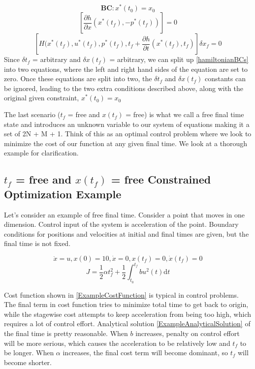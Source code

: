 ﻿\documentclass[twoside]{article}
\begin{document}
$$\textbf{BC}: x^*(t_0) = x_0$$
$$[\frac{\partial{h}}{\partial{x}}(x^*(t_f), - p^*(t_f))] = 0$$
$$[H(x^*(t_f), u^*(t_f), p^*(t_f), t_f + \frac{\partial{h}}{\partial{t}}(x^*(t_f), t_f)]\delta{x_f} = 0$$
Since $\delta{t_f}$ = arbitrary and $\delta{x(t_f)}$ = arbitrary, we can split up \ref{hamiltonianBCs} into two equations, where the left and right hand sides of the equation are set to zero. Once these equations are split into two, the $\delta{t_f}$ and $\delta{x(t_f)}$ constants can be ignored, leading to the two extra conditions described above, along with the original given constraint, $x^*(t_0) = x_0$

The last scenario ($t_f$ = free and $x(t_f)$ = free) is what we call a free final time state and introduces an unknown variable to our system of equations making it a set of 2N + M + 1. Think of this as an optimal control problem where we look to minimize the cost of our function at any given final time. We look at a thorough example for clarification.

\subsection{$t_f$ = free and $x(t_f)$ = free Constrained Optimization Example}
Let's consider an example of free final time. Consider a point that moves in one dimension. Control input of the system is acceleration of the point. Boundary conditions for positions and velocities at initial and final times are given, but the final time is not fixed.

\begin{equation}\label{ExampleSCAndBC}%
\ddot{x} = u, x(0) = 10, \dot{x} = 0, x(t_f) = 0, \dot{x}(t_f) = 0
\end{equation}
\begin{equation}\label{ExampleCostFunction}
J = \frac{1}{2}\alpha t_f^2 + \frac{1}{2} \int_{t_0}^{t_f} bu^2(t) \mathrm{d}t
\end{equation}

Cost function shown in \eqref{ExampleCostFunction} is typical in control problems. The final term in cost function tries to minimize total time to get back to origin, while the stagewise cost attempts to keep acceleration from being too high, which requires a lot of control effort. Analytical solution \eqref{ExampleAnalyticalSolution} of the final time is pretty reasonable. When $b$ increases, penalty on control effort will be more serious, which causes the acceleration to be relatively low and $t_f$ to be longer. When $\alpha$ increases, the final cost term will become dominant, so $t_f$ will become shorter.
\end{document}
